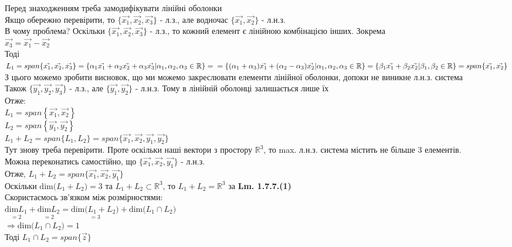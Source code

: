 \documentclass[a4paper, 14pt]{extarticle}
\def\bigline{\vspace{5mm}\\}
\def\dim#1{\textrm{dim} {#1}}
\begin{document}
	Перед знаходженням треба замодифікувати лінійні оболонки\\
	Якщо обережно перевірити, то $\{\vec{x_1}, \vec{x_2}, \vec{x_3}\}$ - л.з., але водночас $\{\vec{x_1},\vec{x_2}\}$ - л.н.з.\\
	В чому проблема? Оскільки $\{\vec{x_1}, \vec{x_2}, \vec{x_3} \}$ - л.з., то кожний елемент є лінійною комбінацією інших. Зокрема\\
	$\vec{x_3} = \vec{x_1} - \vec{x_2}$\\
	Тоді $L_1 = span\{\vec{x_1}, \vec{x_2}, \vec{x_3}\} = \{\alpha_1 \vec{x_1} + \alpha_2 \vec{x_2} + \alpha_3 \vec{x_3} | \alpha_1, \alpha_2, \alpha_3 \in \mathbb{R} \} = \\ = \{(\alpha_1 + \alpha_3) \vec{x_1} + (\alpha_2 - \alpha_3) \vec{x_2} | \alpha_1, \alpha_2, \alpha_3 \in \mathbb{R} \} = \{\beta_1 \vec{x_1} + \beta_2 \vec{x_2} | \beta_1, \beta_2 \in \mathbb{R} \} = span\{\vec{x_1}, \vec{x_2}\}$ \\
	З цього можемо зробити висновок, що ми можемо закреслювати елементи лінійної оболонки, допоки не виникне л.н.з. система\\
	Також $\{\vec{y_1},\vec{y_2},\vec{y_3}\}$ - л.з., але $\{\vec{y_1},\vec{y_2}\}$ - л.н.з. Тому в лінійній оболонці залишається лише їх\\
	Отже: \\
	$L_1 = span\left\{ \vec{x_1}, \vec{x_2} \right\}$\\
	$L_2 = span\left\{ \vec{y_1}, \vec{y_2} \right\}$
	\bigline
	$L_1 + L_2 = span\{L_1, L_2\} = span\{\vec{x_1}, \vec{x_2}, \vec{y_1}, \vec{y_2}\}$\\
	Тут знову треба перевірити. Проте оскільки наші вектори з простору $\mathbb{R}^3$, то max. л.н.з. система містить не більше 3 елементів.\\
	Можна переконатись самостійно, що $\{\vec{x_1}, \vec{x_2}, \vec{y_1}\}$ - л.н.з.\\
	Отже, $L_1 + L_2 = span\{\vec{x_1}, \vec{x_2}, \vec{y_1} \}$\\
	Оскільки $\dim (L_1 + L_2) = 3$ та $L_1 + L_2 \subset \mathbb{R}^3$, то $L_1+L_2= \mathbb{R}^3$ за \textbf{Lm. 1.7.7.(1)}
	\bigline
	Скористаємось зв'язком між розмірностями:\\
	$\underset{=2}{\dim L_1} + \underset{=2}{\dim L_2} = \underset{=3}{\dim (L_1+L_2)} + \dim(L_1 \cap L_2)$\\
	$\Rightarrow \dim (L_1 \cap L_2) = 1$\\
	Тоді $L_1 \cap L_2 = span\{\vec{z}\}$\\
\end{document}
